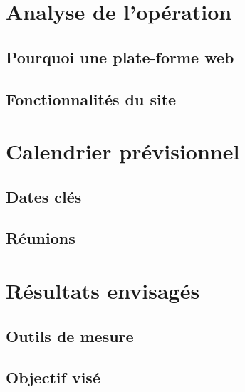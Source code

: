 \documentclass[a4paper, 12pt]{report}
\begin{document}
\chapter{Analyse de l’opération}
\thispagestyle{fancy}
\section{Pourquoi une plate-forme web}
\section{Fonctionnalités du site}

\chapter{Calendrier prévisionnel}
\thispagestyle{fancy}
\section{Dates clés}
\section{Réunions}

\chapter{Résultats envisagés}
\thispagestyle{fancy}
\section{Outils de mesure}
\section{Objectif visé}

\newpage
\appendix
\chapter{}
\thispagestyle{fancy}
\end{document}
